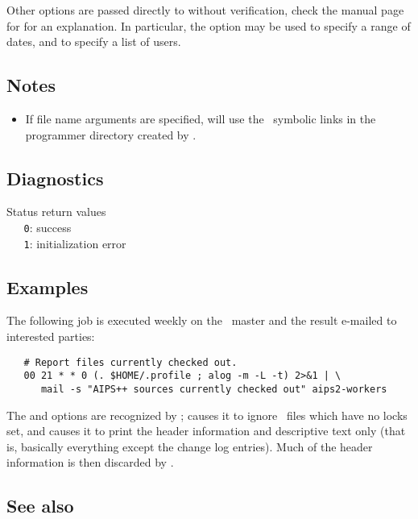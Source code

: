 Other options are passed directly to  without verification,
check the manual page for  for an explanation.  In particular,
the  option may be used to specify a range of dates, and  to
specify a list of users.

\subsection*{Notes}

\begin{itemize}
\item
   If file name arguments are specified,  will use the \rcs\ 
   symbolic links in the programmer directory created by .
\end{itemize}

\subsection*{Diagnostics}

Status return values
\\ \verb+   0+: success
\\ \verb+   1+: initialization error

\subsection*{Examples}

The following  job is executed weekly on the \aipspp\ master
and the result e-mailed to interested parties:

\begin{verbatim}
   # Report files currently checked out.
   00 21 * * 0 (. $HOME/.profile ; alog -m -L -t) 2>&1 | \
      mail -s "AIPS++ sources currently checked out" aips2-workers
\end{verbatim}

\noindent
The  and  options are recognized by ; 
causes it to ignore \rcs\ files which have no locks set, and  causes
it to print the header information and descriptive text only (that is,
basically everything except the change log entries).  Much of the header
information is then discarded by \exe{alog}.

\subsection*{See also}

